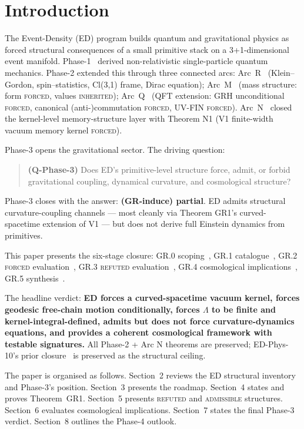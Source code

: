 \documentclass[11pt,a4paper]{article}
\begin{document}
\section{Introduction}

The Event-Density (ED) program builds quantum and gravitational physics as forced structural consequences of a small primitive stack on a 3+1-dimensional event manifold. Phase-1~\cite{phase1} derived non-relativistic single-particle quantum mechanics. Phase-2 extended this through three connected arcs: Arc~R~\cite{arcr} (Klein--Gordon, spin--statistics, Cl(3,1) frame, Dirac equation); Arc~M~\cite{arcm} (mass structure: form \textsc{forced}, values \textsc{inherited}); Arc~Q~\cite{arcq} (QFT extension: GRH unconditional \textsc{forced}, canonical (anti-)commutation \textsc{forced}, UV-FIN \textsc{forced}). Arc~N~\cite{arcn} closed the kernel-level memory-structure layer with Theorem N1 (V1 finite-width vacuum memory kernel \textsc{forced}).

Phase-3 opens the gravitational sector. The driving question:
\begin{quote}
\textbf{(Q-Phase-3)} Does ED's primitive-level structure force, admit, or forbid gravitational coupling, dynamical curvature, and cosmological structure?
\end{quote}

Phase-3 closes with the answer: \textbf{(GR-induce) partial}. ED admits structural curvature-coupling channels --- most cleanly via Theorem GR1's curved-spacetime extension of V1 --- but does not derive full Einstein dynamics from primitives.

This paper presents the six-stage closure: GR.0 scoping~\cite{gr0}, GR.1 catalogue~\cite{gr1}, GR.2 \textsc{forced} evaluation~\cite{gr2}, GR.3 \textsc{refuted} evaluation~\cite{gr3}, GR.4 cosmological implications~\cite{gr4}, GR.5 synthesis~\cite{gr5}.

The headline verdict: \textbf{ED forces a curved-spacetime vacuum kernel, forces geodesic free-chain motion conditionally, forces $\Lambda$ to be finite and kernel-integral-defined, admits but does not force curvature-dynamics equations, and provides a coherent cosmological framework with testable signatures.} All Phase-2 + Arc N theorems are preserved; ED-Phys-10's prior closure~\cite{edphys10} is preserved as the structural ceiling.

The paper is organised as follows. Section~2 reviews the ED structural inventory and Phase-3's position. Section~3 presents the roadmap. Section~4 states and proves Theorem~GR1. Section~5 presents \textsc{refuted} and \textsc{admissible} structures. Section~6 evaluates cosmological implications. Section~7 states the final Phase-3 verdict. Section~8 outlines the Phase-4 outlook.
\end{document}
